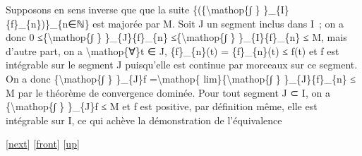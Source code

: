 \documentclass[]{article}
\begin{document}
Supposons en sens inverse que que la suite
\{(\{\textbackslash{}mathop\{∫ \} \}\_\{I\}\{f\}\_\{n\})\}\_\{n∈ℕ\} est
majorée par M. Soit J un segment inclus dans I~; on a donc 0
≤\{\textbackslash{}mathop\{∫ \} \}\_\{J\}\{f\}\_\{n\}
≤\{\textbackslash{}mathop\{∫ \} \}\_\{I\}\{f\}\_\{n\} ≤ M, mais d'autre
part, on a \textbackslash{}mathop\{∀\}t ∈ J,
\textbar{}\{f\}\_\{n\}(t)\textbar{} = \{f\}\_\{n\}(t) ≤ f(t) et f est
intégrable sur le segment J puisqu'elle est continue par morceaux sur ce
segment. On a donc \{\textbackslash{}mathop\{∫ \} \}\_\{J\}f
=\textbackslash{}mathop\{ lim\}\{\textbackslash{}mathop\{∫ \}
\}\_\{J\}\{f\}\_\{n\} ≤ M par le théorème de convergence dominée. Pour
tout segment J ⊂ I, on a \{\textbackslash{}mathop\{∫ \} \}\_\{J\}f ≤ M
et f est positive, par définition même, elle est intégrable sur I, ce
qui achève la démonstration de l'équivalence

{[}\href{coursse61.html}{next}{]} {[}\href{coursse60.html}{front}{]}
{[}\href{coursch11.html\#coursse60.html}{up}{]}
\end{document}
